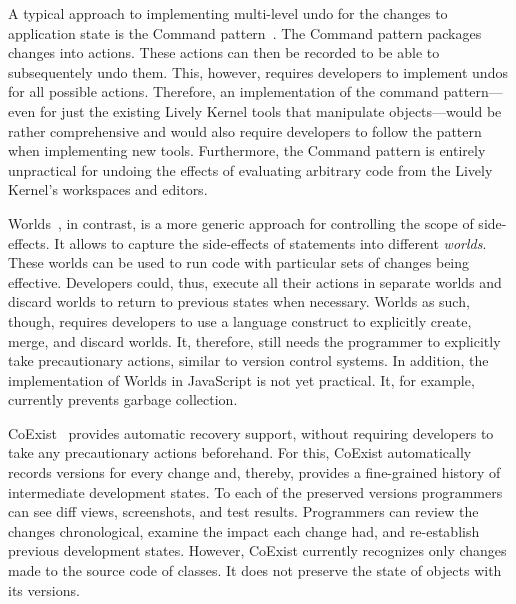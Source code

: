 A typical approach to implementing multi-level undo for the changes to application state is the Command pattern~\cite{GammaHelmJohnsonVlissides95}.
The Command pattern packages changes into actions.
These actions can then be recorded to be able to subsequentely undo them.
This, however, requires developers to implement undos for all possible actions.
Therefore, an implementation of the command pattern---even for just the existing Lively Kernel tools that manipulate objects---would be rather comprehensive and would also require developers to follow the pattern when implementing new tools.
Furthermore, the Command pattern is entirely unpractical for undoing the effects of evaluating arbitrary code from the Lively Kernel's workspaces and editors.

Worlds~\cite{Warth2011Wor}, in contrast, is a more generic approach for controlling the scope of side-effects.
It allows to capture the side-effects of statements into different \emph{worlds}.
These worlds can be used to run code with particular sets of changes being effective.
Developers could, thus, execute all their actions in separate worlds and discard worlds to return to previous states when necessary.
Worlds as such, though, requires developers to use a language construct to explicitly create, merge, and discard worlds.
It, therefore, still needs the programmer to explicitly take precautionary actions, similar to version control systems.
In addition, the implementation of Worlds in JavaScript is not yet practical.
It, for example, currently prevents garbage collection.

CoExist~\cite{Steinert2012COE,Steinert2014EVA} provides automatic recovery support, without requiring developers to take any precautionary actions beforehand.
For this, CoExist automatically records versions for every change and, thereby, provides a fine-grained history of intermediate development states.
To each of the preserved versions programmers can see diff views, screenshots, and test results.
Programmers can review the changes chronological, examine the impact each change had, and re-establish previous development states.
However, CoExist currently recognizes only changes made to the source code of classes.
It does not preserve the state of objects with its versions.

